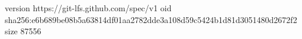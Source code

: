 version https://git-lfs.github.com/spec/v1
oid sha256:e6b689be08b5a63814df01aa2782dde3a108d59c5424b1d81d3051480d2672f2
size 87556
